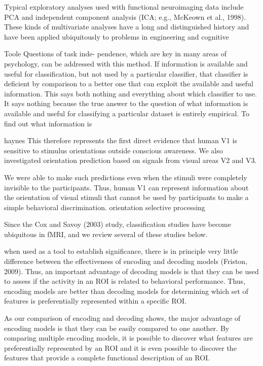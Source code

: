 \documentclass[authoryear,review,3p]{elsarticle}
\begin{document}
Typical exploratory analyses used with functional neuroimaging data include PCA and independent component analysis (ICA; e.g., McKeown et al., 1998). These kinds of multivariate analyses have a long and distinguished history and have been applied ubiquitously to problems in engineering and cognitive


Toole
Questions of task inde- pendence, which are key in many areas of psychology, can be addressed with this method.
If information is available and useful for classification, but not used by a particular classifier, that classifier is deficient by comparison to a better one that can exploit the available and useful information. This says both nothing and everything about which classifier to use. It says nothing because the true answer to the question of what information is available and useful for classifying a particular dataset is entirely empirical. To find out what information is




haynes
This therefore represents the first direct evidence that human V1 is sensitive to stimulus orientations outside conscious awareness. We also investigated orientation prediction based on signals from visual areas V2 and V3. 

We were able to make such predictions even when the stimuli were completely invisible to the participants. Thus, human V1 can represent information about the orientation of visual stimuli that cannot be used by participants to make a simple behavioral discrimination.
orientation selective processing

Since the Cox and Savoy (2003) study, classification studies have become ubiquitous in fMRI, and we review several of these studies below. 

when used as a tool to establish significance, there is in principle very little difference between the effectiveness of encoding and decoding models (Friston, 2009).
Thus, an important advantage of decoding models is that they can be used to assess if the activity in an ROI is related to behavioral performance.
Thus, encoding models are better than decoding models for determining which set of features is preferentially represented within a specific ROI.

As our comparison of encoding and decoding shows, the major advantage of encoding models is that they can be easily compared to one another. By comparing multiple encoding models, it is possible to discover what features are preferentially represented by an ROI and it is even possible to discover the features that provide a complete functional description of an ROI. 
\end{document}
